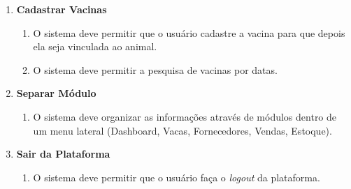 \documentclass[12pt, a4paper]{article}
\begin{document}
\begin{spacing}{1.5}
\begin{enumerate}[label=RF\arabic{*}.]
    \item \textbf{Cadastrar Vacinas}
    \begin{enumerate}[label=RF11.0\arabic{*}]
        \item O sistema deve permitir que o usuário cadastre a vacina para que depois ela seja vinculada ao animal.
        \item O sistema deve permitir a pesquisa de vacinas por datas.
    \end{enumerate}
    \item \textbf{Separar Módulo}
    \begin{enumerate}[label=RF12.0\arabic{*}]
        \item O sistema deve organizar as informações através de módulos dentro de um menu lateral (Dashboard, Vacas, Fornecedores, Vendas, Estoque).
    \end{enumerate}
    \item \textbf{Sair da Plataforma}
    \begin{enumerate}[label=RF13.0\arabic{*}]
        \item O sistema deve permitir que o usuário faça o \textit{logout} da plataforma.
    \end{enumerate}
\end{enumerate}
\end{spacing}
\end{document}
